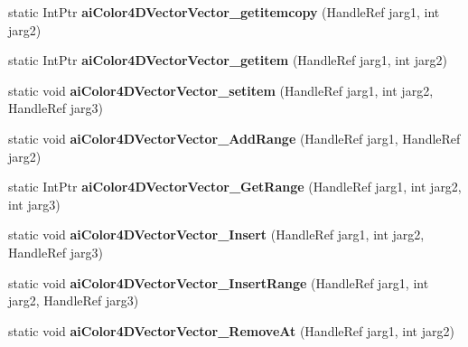 \begin{DoxyCompactItemize}
\item 
\hypertarget{class_assimp_p_i_n_v_o_k_e_af98aabc3258df70a247dd7174e517a65}{static Int\+Ptr {\bfseries ai\+Color4\+D\+Vector\+Vector\+\_\+getitemcopy} (Handle\+Ref jarg1, int jarg2)}\label{class_assimp_p_i_n_v_o_k_e_af98aabc3258df70a247dd7174e517a65}

\item 
\hypertarget{class_assimp_p_i_n_v_o_k_e_a05667cfcd9222ab61ee5aee02e67a4bb}{static Int\+Ptr {\bfseries ai\+Color4\+D\+Vector\+Vector\+\_\+getitem} (Handle\+Ref jarg1, int jarg2)}\label{class_assimp_p_i_n_v_o_k_e_a05667cfcd9222ab61ee5aee02e67a4bb}

\item 
\hypertarget{class_assimp_p_i_n_v_o_k_e_a8806779fa0f4458153b60ca4520d13c7}{static void {\bfseries ai\+Color4\+D\+Vector\+Vector\+\_\+setitem} (Handle\+Ref jarg1, int jarg2, Handle\+Ref jarg3)}\label{class_assimp_p_i_n_v_o_k_e_a8806779fa0f4458153b60ca4520d13c7}

\item 
\hypertarget{class_assimp_p_i_n_v_o_k_e_a2744daea64ac2187772dc85398e82258}{static void {\bfseries ai\+Color4\+D\+Vector\+Vector\+\_\+\+Add\+Range} (Handle\+Ref jarg1, Handle\+Ref jarg2)}\label{class_assimp_p_i_n_v_o_k_e_a2744daea64ac2187772dc85398e82258}

\item 
\hypertarget{class_assimp_p_i_n_v_o_k_e_a67c86a12e4d647e6cf305a83c4edb741}{static Int\+Ptr {\bfseries ai\+Color4\+D\+Vector\+Vector\+\_\+\+Get\+Range} (Handle\+Ref jarg1, int jarg2, int jarg3)}\label{class_assimp_p_i_n_v_o_k_e_a67c86a12e4d647e6cf305a83c4edb741}

\item 
\hypertarget{class_assimp_p_i_n_v_o_k_e_a36298aa87e160d7028d06e1034f2c94d}{static void {\bfseries ai\+Color4\+D\+Vector\+Vector\+\_\+\+Insert} (Handle\+Ref jarg1, int jarg2, Handle\+Ref jarg3)}\label{class_assimp_p_i_n_v_o_k_e_a36298aa87e160d7028d06e1034f2c94d}

\item 
\hypertarget{class_assimp_p_i_n_v_o_k_e_a1ea3aff9009701d68c094ffa5f588160}{static void {\bfseries ai\+Color4\+D\+Vector\+Vector\+\_\+\+Insert\+Range} (Handle\+Ref jarg1, int jarg2, Handle\+Ref jarg3)}\label{class_assimp_p_i_n_v_o_k_e_a1ea3aff9009701d68c094ffa5f588160}

\item 
\hypertarget{class_assimp_p_i_n_v_o_k_e_adeea7e3d55e17484dd60436c1b0554fd}{static void {\bfseries ai\+Color4\+D\+Vector\+Vector\+\_\+\+Remove\+At} (Handle\+Ref jarg1, int jarg2)}\label{class_assimp_p_i_n_v_o_k_e_adeea7e3d55e17484dd60436c1b0554fd}


\end{DoxyCompactItemize}
